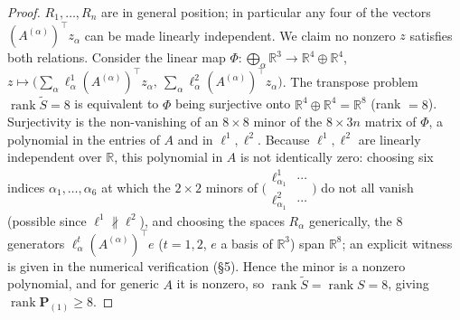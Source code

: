 \documentclass[12pt]{article}
\DeclareMathOperator{\rank}{rank}
\newcommand{\bR}{\mathbb{R}}
\theoremstyle{definition}
\begin{document}
\begin{proof}
$R_1,\dots,R_n$ are in general position; in particular any four of the vectors
$(A^{(\alpha)})^\top z_\alpha$ can be made linearly independent.  We claim no
nonzero $z$ satisfies both relations.  Consider the linear map
$\Phi:\bigoplus_\alpha\bR^3\to\bR^4\oplus\bR^4$,
$z\mapsto\bigl(\sum_\alpha\ell^1_\alpha(A^{(\alpha)})^\top z_\alpha,\ \sum_\alpha\ell^2_\alpha(A^{(\alpha)})^\top z_\alpha\bigr)$.
The transpose problem $\rank\widetilde S=8$ is equivalent to $\Phi$ being surjective
onto $\bR^4\oplus\bR^4=\bR^8$ (rank $=8$).  Surjectivity is the non-vanishing of an
$8\times8$ minor of the $8\times3n$ matrix of $\Phi$, a polynomial in the entries of
$A$ and in $\ell^1,\ell^2$.  Because $\ell^1,\ell^2$ are linearly independent over
$\bR$, this polynomial in $A$ is not identically zero: choosing six indices
$\alpha_1,\dots,\alpha_6$ at which the $2\times2$ minors of
$\bigl(\begin{smallmatrix}\ell^1_{\alpha_1}&\cdots\\ \ell^2_{\alpha_1}&\cdots\end{smallmatrix}\bigr)$
do not all vanish (possible since $\ell^1\not\parallel\ell^2$), and choosing the
spaces $R_{\alpha}$ generically, the $8$ generators
$\ell^t_{\alpha} (A^{(\alpha)})^\top e$ ($t=1,2$, $e$ a basis of $\bR^3$) span
$\bR^8$; an explicit witness is given in the numerical verification (\S5).  Hence
the minor is a nonzero polynomial, and for generic $A$ it is nonzero, so
$\rank\widetilde S=\rank S=8$, giving $\rank\mathbf P_{(1)}\ge8$.


\end{proof}
\end{document}
